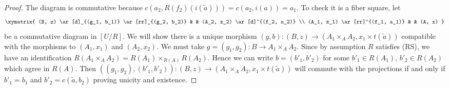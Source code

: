 \begin{proof}
\medskip\noindent
The diagram is commutative because
$c(a_2, R(f_2)(i(\widetilde{a}))) = c(a_2, i(a)) = a_1$.
To check it is a fiber square, let
$$
\xymatrix{
(B, z) \ar[d]_{(g_1, b_1)} \ar[rr]_{(g_2, b_2)} & & (A_2, x_2)
\ar[d]^{(f_2, a_2)} \\
(A_1, x_1) \ar[rr]^{(f_1, a_1)} & & (A, x)
}
$$
be a commutative diagram in $[U/R]$. We will show there is a unique morphism
$(g, b) : (B, z) \to (A_1 \times_A A_2, x_1 \times t(\widetilde{a}))$
compatible with the morphisms to $(A_1, x_1)$ and $(A_2, x_2)$.
We must take $g = (g_1, g_2) : B \to A_1 \times_A A_2$.
Since by assumption $R$ satisfies (RS), we have an identification
$R(A_1 \times_A A_2) = R(A_1) \times_{R(A)} R(A_2)$.
Hence we can write $b = (b'_1, b'_2)$ for some
$b'_1 \in R(A_1)$, $b'_2 \in R(A_2)$ which agree in $R(A)$.
Then
$((g_1, g_2), (b'_1, b'_2)) : (B, z) \to
(A_1 \times_A A_2, x_1 \times t(\widetilde{a}))$
will commute with the projections if and only if
$b'_1 = b_1$ and $b'_2 = c(\widetilde{a}, b_2)$ proving unicity and
existence.
\end{proof}